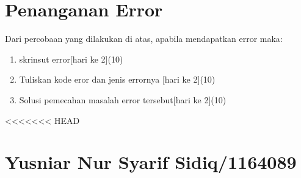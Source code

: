 \section{Penanganan Error}
Dari percobaan yang dilakukan di atas, apabila mendapatkan error maka:

\begin{enumerate}
	\item
	skrinsut error[hari ke 2](10)
	\item
Tuliskan kode eror dan jenis errornya [hari ke 2](10)
	\item
Solusi pemecahan masalah error tersebut[hari ke 2](10)

\end{enumerate}

<<<<<<< HEAD
\section{Yusniar Nur Syarif Sidiq/1164089}
